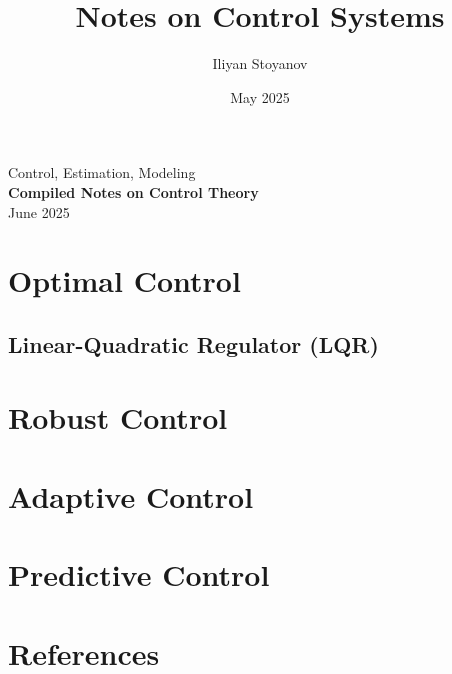 \documentclass[a4paper, 12pt, use style=flow, title in boldface, theorem in new line, emphasize theorems]{einfart} %
\title{Notes on Control Systems}
\author{Iliyan Stoyanov}
\date{May 2025}
\numberwithin{equation}{section}
\begin{document}
\begin{center}
\LARGE
Control, Estimation, Modeling \\
\vspace{0.5in}
\Huge 
\textbf{Compiled Notes on Control Theory} \\
\vspace{3.5in}
\Large
\vspace{1in}
\normalsize
\vspace{3in}
June 2025
\end{center}

\newpage

\tableofcontents

\newpage


\newpage


\newpage


\newpage


\newpage


\newpage


\newpage


\newpage
\section{Optimal Control}
\subsection{Linear-Quadratic Regulator (LQR)}

\newpage
\section{Robust Control}

\newpage
\section{Adaptive Control}

\newpage
\section{Predictive Control}

\newpage


\newpage


\newpage


\newpage


\newpage
\section{References}
\end{document}
